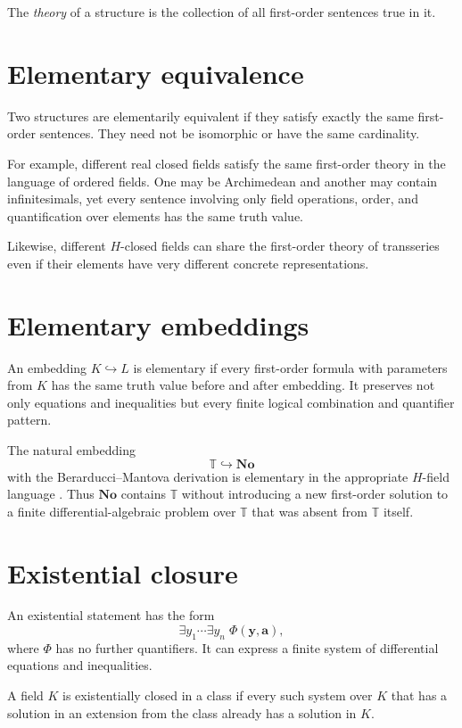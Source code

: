 \documentclass[11pt,openany]{book}
\theoremstyle{definition}
\theoremstyle{plain}
\theoremstyle{remark}
\newcommand{\T}{\mathbb{T}}
\begin{document}
The \emph{theory} of a structure is the collection of all first-order sentences true in it.

\section{Elementary equivalence}

Two structures are elementarily equivalent if they satisfy exactly the same first-order sentences. They need not be isomorphic or have the same cardinality.

For example, different real closed fields satisfy the same first-order theory in the language of ordered fields. One may be Archimedean and another may contain infinitesimals, yet every sentence involving only field operations, order, and quantification over elements has the same truth value.

Likewise, different $H$-closed fields can share the first-order theory of transseries even if their elements have very different concrete representations.

\section{Elementary embeddings}

An embedding $K\hookrightarrow L$ is elementary if every first-order formula with parameters from $K$ has the same truth value before and after embedding. It preserves not only equations and inequalities but every finite logical combination and quantifier pattern.

The natural embedding
\[
 \T\hookrightarrow\mathbf{No}
\]
with the Berarducci--Mantova derivation is elementary in the appropriate $H$-field language \cite{adh-universal-surreal}. Thus $\mathbf{No}$ contains $\T$ without introducing a new first-order solution to a finite differential-algebraic problem over $\T$ that was absent from $\T$ itself.

\section{Existential closure}

An existential statement has the form
\[
 \exists y_1\cdots\exists y_n\;\Phi(\mathbf y,\mathbf a),
\]
where $\Phi$ has no further quantifiers. It can express a finite system of differential equations and inequalities.

A field $K$ is existentially closed in a class if every such system over $K$ that has a solution in an extension from the class already has a solution in $K$.
\end{document}

